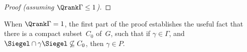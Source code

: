 \begin{proof}[Proof \normalfont (assuming $\Qrank \Gamma \le 1$)]
%
\end{proof}


\begin{rem} \label{CuspGroup}
When $\Qrank \Gamma = 1$, the first part of the proof establishes the useful fact that there is a compact subset~$C_0$ of~$G$, such that if $\gamma \in \Gamma$, and $\Siegel \cap \gamma \Siegel \not\subseteq C_0$, then $\gamma \in P$.
\end{rem}

